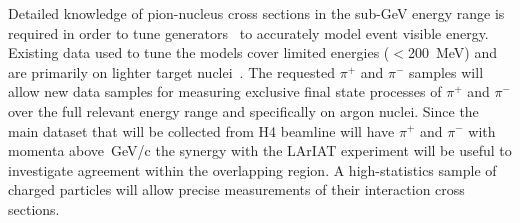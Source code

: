 Detailed knowledge of pion-nucleus cross sections in the sub-GeV energy range is required in order
to tune generators~\cite{genie} to accurately model event visible energy. 
Existing data used to tune the models cover limited energies ($<$200~MeV) and are primarily on lighter target nuclei~\cite{fsirev}.
The requested $\pi^+$ and $\pi^-$ samples will allow new data samples for measuring
exclusive final state processes  of $\pi^+$ and $\pi^-$ over the full relevant energy range and specifically on argon nuclei. Since the main dataset that will be collected from H4 beamline will have $\pi^+$ and $\pi^-$ with momenta above\, GeV/c the synergy with the LArIAT experiment will be useful to investigate agreement within the overlapping region.   
A high-statistics sample of charged particles will allow precise measurements of their interaction cross sections.

